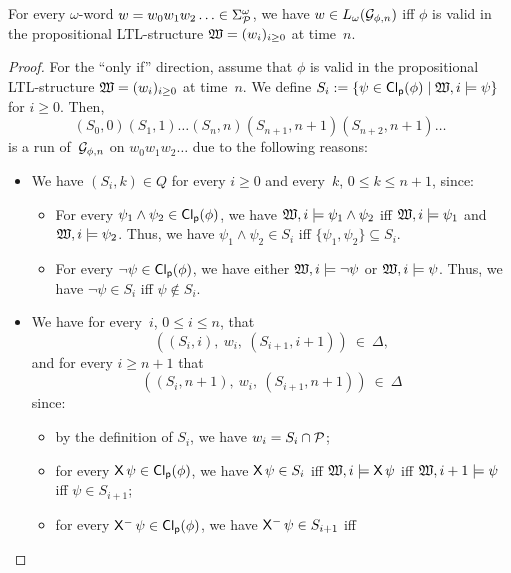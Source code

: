 \begin{lemma}\label{lem:gba-phi-n}
    For every $\omega$-word $w=w_0w_1w_2\dotso\in\Sigma_\mathcal{P}^\omega$, we have
    $w\in L_\omega(\mathcal{G}_{\phi,n})$ iff $\phi$ is valid in the propositional
    LTL-structure $\mathfrak{W}=(w_i)_{i\ge 0}$ at time~$n$.
\end{lemma}

\begin{proof}
    For the \enquote{only if} direction, assume that $\phi$ is valid in the
    propositional LTL-structure $\mathfrak{W}=(w_i)_{i\ge 0}$ at time~$n$.  We define
    $S_i:=\{\psi\in\operatorname{\mathsf{Cl_p}}(\phi)\mid\mathfrak{W},i\models\psi\}$ for $i\ge 0$.  Then,
    \[(S_0,0)(S_1,1)\dots(S_n,n)(S_{n+1},n+1)(S_{n+2},n+1)\dots\]
    is a run of~$\mathcal{G}_{\phi,n}$ on $w_0w_1w_2\dots$ due to the following
    reasons:
    \begin{itemize}
        \item We have $(S_i,k)\in Q$ for every $i\ge 0$ and every~$k$,
            $0\le k\le n+1$, since:
            \begin{itemize}
                \item For every $\psi_1\land\psi_2\in\operatorname{\mathsf{Cl_p}}(\phi)$, we have
                    $\mathfrak{W},i\models\psi_1\land\psi_2$ iff $\mathfrak{W},i\models\psi_1$
                    and $\mathfrak{W},i\models\psi_2$.  Thus, we have $\psi_1\land\psi_2\in S_i$ iff
                    $\{\psi_1,\psi_2\}\subseteq S_i$.
                \item For every $\lnot\psi\in\operatorname{\mathsf{Cl_p}}(\phi)$, we have either
                    $\mathfrak{W},i\models\lnot\psi$ or $\mathfrak{W},i\models\psi$.  Thus, we
                    have $\lnot\psi\in S_i$ iff $\psi\notin S_i$.
            \end{itemize}
        \item We have for every~$i$, $0\le i\le n$, that
            \[((S_i,i),\ w_i,\ (S_{i+1},i+1))\ \in\ \Delta,\]
            and for every $i\ge n+1$ that
            \[((S_i,n+1),\ w_i,\ (S_{i+1},n+1))\ \in\ \Delta\]
            since:
            \begin{itemize}
                \item by the definition of $S_i$, we have $w_i=S_i\cap\mathcal{P}$;
                \item for every $\operatorname{\mathsf{X}}\psi\in\operatorname{\mathsf{Cl_p}}(\phi)$, we have
                    $\operatorname{\mathsf{X}}\psi\in S_i$ iff $\mathfrak{W},i\models\operatorname{\mathsf{X}}\psi$ iff
                    $\mathfrak{W},i+1\models\psi$ iff $\psi\in S_{i+1}$;
                \item for every $\Previous\psi\in\PCl(\phi)$, we have
                    $\Previous\psi\in S_{i+1}$ iff

\end{itemize}
\end{itemize}
\end{proof}

